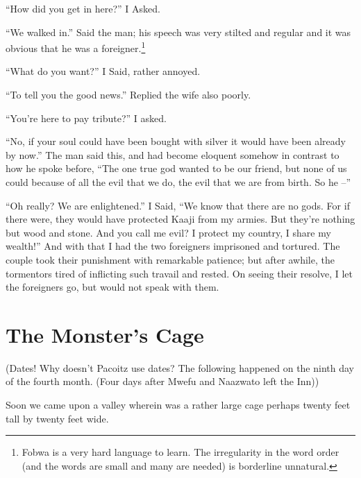 ``How did you get in here?'' I Asked.

``We walked in.'' Said the man; his speech was very stilted and regular and it was obvious that he was a foreigner.\footnote{Fobwa is a very hard language to learn. The irregularity in the word order (and the words are small and many are needed) is borderline unnatural.}

``What do you want?'' I Said, rather annoyed.

``To tell you the good news.'' Replied the wife also poorly.

``You're here to pay tribute?'' I asked.

``No, if your soul could have been bought with silver it would have been already by now.'' The man said this, and had become eloquent somehow in contrast to how he spoke before, ``The one true god wanted to be our friend, but none of us could because of all the evil that we do, the evil that we are from birth. So he --''

``Oh really? We are enlightened.'' I Said, ``We know that there are no gods. For if there were, they would have protected Kaaji from my armies. But they're nothing but wood and stone. And you call me evil? I protect my country, I share my wealth!'' And with that I had the two foreigners imprisoned and tortured. The couple took their punishment with remarkable patience; but after awhile, the tormentors tired of inflicting such travail and rested. On seeing their resolve, I let the foreigners go, but would not speak with them.

\section{The Monster's Cage}
(Dates! Why doesn't Pacoitz use dates? The following happened on the ninth day of the fourth month. (Four days after Mwefu and Naazwato left the Inn))

Soon we came upon a valley wherein was a rather large cage perhaps twenty feet tall by twenty feet wide. 
